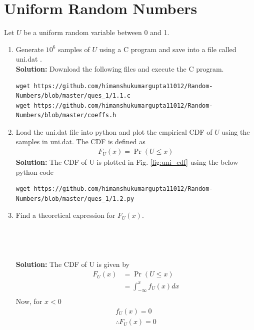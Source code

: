 \documentclass[journal,12pt,twocolumn]{IEEEtran}
\renewcommand\thesection{\arabic{section}}
\providecommand{\pr}[1]{\ensuremath{\Pr\left(#1\right)}}
\theoremstyle{remark}
\newcommand{\solution}{\noindent \textbf{Solution: }}
\numberwithin{equation}{section}
\begin{document}
\vspace{-6mm}
\begin{center}
\par\end{center}

\section{Uniform Random Numbers}
Let $U$ be a uniform random variable between 0 and 1.
\begin{enumerate}[label=\thesection.\arabic*
,ref=\thesection.\theenumi]
\item Generate $10^6$ samples of $U$ using a C program and save into a file called uni.dat .
\\
\solution Download the following files and execute the  C program.
\begin{lstlisting}
wget https://github.com/himanshukumargupta11012/Random-Numbers/blob/master/ques_1/1.1.c
wget https://github.com/himanshukumargupta11012/Random-Numbers/blob/master/coeffs.h
\end{lstlisting}
%
\item
Load the uni.dat file into python and plot the empirical CDF of $U$ using the samples in uni.dat. The CDF is defined as
\begin{align}
F_{U}(x) = \pr{U \le x}
\end{align}
\solution The CDF of U is plotted in Fig. \ref{fig:uni_cdf}
using the below python code
\begin{lstlisting}
wget https://github.com/himanshukumargupta11012/Random-Numbers/blob/master/ques_1/1.2.py
\end{lstlisting}
%
\item
Find a  theoretical expression for $F_{U}(x)$.
\\
\\
\\
\\
\\

\solution 
The CDF of U is given by
\begin{align}
	F_U(x)&=\pr{ U\leq x}\\
	&=\int_{-\infty}^x f_U(x)dx\\
\end{align}
Now, for $x<0$
\begin{align}
	f_U(x)=0\\
\therefore F_U(x)=0
\end{align}



\end{enumerate}
\end{document}
